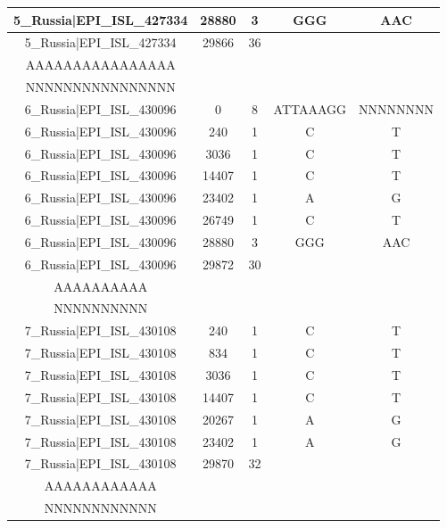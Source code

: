\documentclass[a4paper,10pt]{article}
\begin{document}
\begin{longtable}{@{}ccccc@{}}
5\_Russia|EPI\_ISL\_427334 & 28880 & 3 & GGG & AAC \\* \midrule
5\_Russia|EPI\_ISL\_427334 & 29866 & 36 & \begin{tabular}[c]{@{}c@{}}GACAAAAAAAAAAAAAAAAA\\ AAAAAAAAAAAAAAAA\end{tabular} & \begin{tabular}[c]{@{}c@{}}NNNNNNNNNNNNNNNNNNNN\\ NNNNNNNNNNNNNNNN\end{tabular} \\* \midrule
6\_Russia|EPI\_ISL\_430096 & 0 & 8 & ATTAAAGG & NNNNNNNN \\* \midrule
6\_Russia|EPI\_ISL\_430096 & 240 & 1 & C & T \\* \midrule
6\_Russia|EPI\_ISL\_430096 & 3036 & 1 & C & T \\* \midrule
6\_Russia|EPI\_ISL\_430096 & 14407 & 1 & C & T \\* \midrule
6\_Russia|EPI\_ISL\_430096 & 23402 & 1 & A & G \\* \midrule
6\_Russia|EPI\_ISL\_430096 & 26749 & 1 & C & T \\* \midrule
6\_Russia|EPI\_ISL\_430096 & 28880 & 3 & GGG & AAC \\* \midrule
6\_Russia|EPI\_ISL\_430096 & 29872 & 30 & \begin{tabular}[c]{@{}c@{}}AAAAAAAAAAAAAAAAAAAA\\ AAAAAAAAAA\end{tabular} & \begin{tabular}[c]{@{}c@{}}NNNNNNNNNNNNNNNNNNNN\\ NNNNNNNNNN\end{tabular} \\* \midrule
7\_Russia|EPI\_ISL\_430108 & 240 & 1 & C & T \\* \midrule
7\_Russia|EPI\_ISL\_430108 & 834 & 1 & C & T \\* \midrule
7\_Russia|EPI\_ISL\_430108 & 3036 & 1 & C & T \\* \midrule
7\_Russia|EPI\_ISL\_430108 & 14407 & 1 & C & T \\* \midrule
7\_Russia|EPI\_ISL\_430108 & 20267 & 1 & A & G \\* \midrule
7\_Russia|EPI\_ISL\_430108 & 23402 & 1 & A & G \\* \midrule
7\_Russia|EPI\_ISL\_430108 & 29870 & 32 & \begin{tabular}[c]{@{}c@{}}AAAAAAAAAAAAAAAAAAAA\\ AAAAAAAAAAAA\end{tabular} & \begin{tabular}[c]{@{}c@{}}NNNNNNNNNNNNNNNNNNNN\\ NNNNNNNNNNNN\end{tabular} \\* \bottomrule
\end{longtable}
\end{document}
